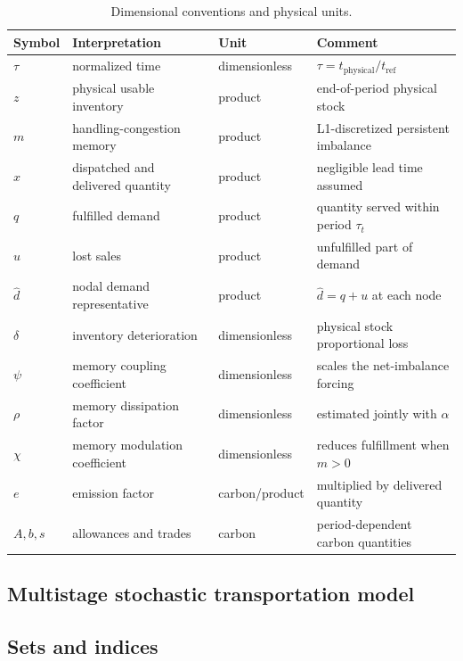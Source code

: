 \documentclass[11pt,a4paper]{article}
\renewcommand{\arraystretch}{1.15}
\begin{document}
\begin{table}[htbp]
\centering
\renewcommand{\arraystretch}{1.25}
\caption{Dimensional conventions and physical units.}
\label{tab:dimensions}
\begin{tabularx}{\textwidth}{@{}lllX@{}}
\toprule
Symbol & Interpretation & Unit & Comment\\
\midrule
\(\tau\) & normalized time & dimensionless &
  \(\tau=t_{\mathrm{physical}}/t_{\mathrm{ref}}\)\\
\(z\) & physical usable inventory & product &
  end-of-period physical stock\\
\(m\) & handling-congestion memory & product &
  L1-discretized persistent imbalance\\
\(x\) & dispatched and delivered quantity & product &
  negligible lead time assumed\\
\(q\) & fulfilled demand & product &
  quantity served within period \(\tau_t\)\\
\(u\) & lost sales & product &
  unfulfilled part of demand\\
\(\widehat{d}\) & nodal demand representative & product &
  \(\widehat{d}=q+u\) at each node\\
\(\delta\) & inventory deterioration & dimensionless &
  physical stock proportional loss\\
\(\psi\) & memory coupling coefficient & dimensionless &
  scales the net-imbalance forcing\\
\(\rho\) & memory dissipation factor & dimensionless &
  estimated jointly with \(\alpha\)\\
\(\chi\) & memory modulation coefficient & dimensionless &
  reduces fulfillment when \(m>0\)\\
\(e\) & emission factor & carbon/product &
  multiplied by delivered quantity\\
\(A,b,s\) & allowances and trades & carbon &
  period-dependent carbon quantities\\
\bottomrule
\end{tabularx}
\end{table}

\subsection{Multistage stochastic transportation model}
\label{sec:model}

\subsection{Sets and indices}
\end{document}
